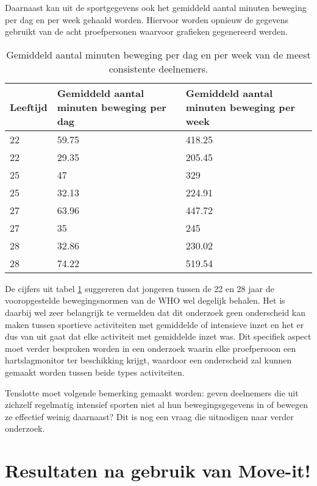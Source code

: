 Daarnaast kan uit de sportgegevens ook het gemiddeld aantal minuten beweging per dag en per week gehaald worden. Hiervoor worden opnieuw de gegevens gebruikt van de acht proefpersonen waarvoor grafieken gegenereerd werden.

\begin{table}[h]
    \caption[Gemiddeld aantal minuten beweging per dag en per week]{Gemiddeld aantal minuten beweging per dag en per week van de meest consistente deelnemers.}
    \centering
    \label{table:gemiddeldes}
\begin{tabular}{||m{.2\linewidth} m{.4\linewidth} m{.4\linewidth}||}
    \hline
    Leeftijd & Gemiddeld aantal minuten beweging per dag & Gemiddeld aantal minuten beweging per week \\ [0.5ex]
    \hline\hline
    22 & 59.75 & 418.25 \\
    22 & 29.35 & 205.45 \\
    25 & 47 & 329 \\
    25 & 32.13 & 224.91 \\
    27 & 63.96 & 447.72 \\
    27 & 35 & 245 \\
    28 & 32.86 & 230.02 \\
    28 & 74.22 & 519.54 \\ [1ex]
    \hline
\end{tabular}
\end{table}

De cijfers uit tabel \ref{table:gemiddeldes} suggereren dat jongeren tussen de 22 en 28 jaar de vooropgestelde bewegingsnormen van de WHO wel degelijk behalen.
Het is daarbij wel zeer belangrijk te vermelden dat dit onderzoek geen onderscheid kan maken tussen sportieve activiteiten met gemiddelde of intensieve inzet en het er dus van uit gaat dat elke activiteit met gemiddelde inzet was. Dit specifiek aspect moet verder besproken worden in een onderzoek waarin elke proefpersoon een hartslagmonitor ter beschikking krijgt, waardoor een onderscheid zal kunnen gemaakt worden tussen beide types activiteiten.

Tenslotte moet volgende bemerking gemaakt worden: geven deelnemers die uit zichzelf regelmatig intensief sporten niet al hun bewegingsgegevens in of bewegen ze effectief weinig daarnaast? Dit is nog een vraag die uitnodigen naar verder onderzoek.

\section{Resultaten na gebruik van Move-it!}


